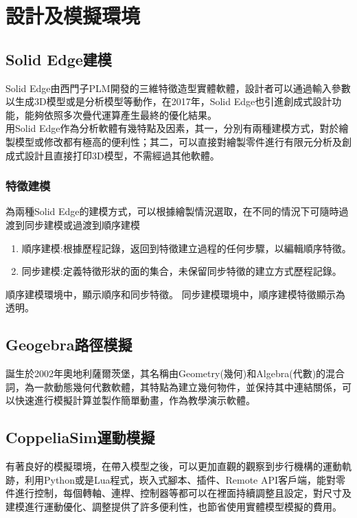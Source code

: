 \chapter{設計及模擬環境}

\section{Solid Edge建模}
Solid Edge由西門子PLM開發的三維特徵造型實體軟體，設計者可以通過輸入參數以生成3D模型或是分析模型等動作，在2017年，Solid Edge也引進創成式設計功能，能夠依照多次疊代運算產生最終的優化結果。\\

用Solid Edge作為分析軟體有幾特點及因素，其一，分別有兩種建模方式，對於繪製模型或修改都有極高的便利性；其二，可以直接對繪製零件進行有限元分析及創成式設計且直接打印3D模型，不需經過其他軟體。\\

\subsection{特徵建模}
為兩種Solid Edge的建模方式，可以根據繪製情況選取，在不同的情況下可隨時過渡到同步建模或過渡到順序建模\
\begin{enumerate}
\item 順序建模:根據歷程記錄，返回到特徵建立過程的任何步驟，以編輯順序特徵。
\item 同步建模:定義特徵形狀的面的集合，未保留同步特徵的建立方式歷程記錄。\
\end{enumerate}
順序建模環境中，顯示順序和同步特徵。
同步建模環境中，順序建模特徵顯示為透明。\
\newpage

\section{Geogebra路徑模擬}
誕生於2002年奧地利薩爾茨堡，其名稱由Geometry(幾何)和Algebra(代數)的混合詞，為一款動態幾何代數軟體，其特點為建立幾何物件，並保持其中連結關係，可以快速進行模擬計算並製作簡單動畫，作為教學演示軟體。\\

\section{CoppeliaSim運動模擬}
有著良好的模擬環境，在帶入模型之後，可以更加直觀的觀察到步行機構的運動軌跡，利用Python或是Lua程式，崁入式腳本、插件、Remote API客戶端，能對零件進行控制，每個轉軸、連桿、控制器等都可以在裡面持續調整且設定，對尺寸及建模進行運動優化、調整提供了許多便利性，也節省使用實體模型模擬的費用。\\


